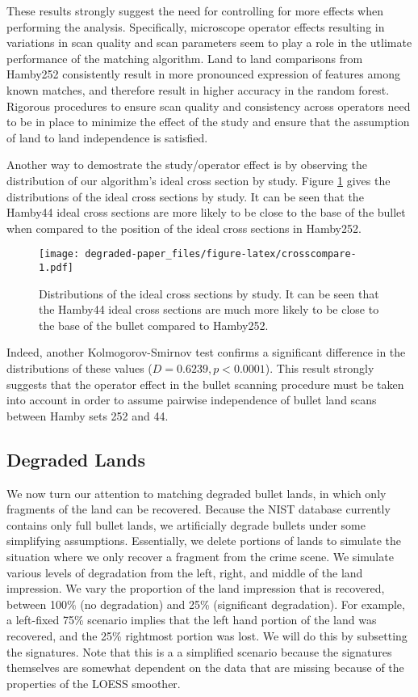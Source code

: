 \documentclass[12pt,]{article}
\theoremstyle{definition}
\theoremstyle{definition}
\theoremstyle{definition}
\theoremstyle{remark}
\begin{document}
These results strongly suggest the need for controlling for more effects
when performing the analysis. Specifically, microscope operator effects
resulting in variations in scan quality and scan parameters seem to play
a role in the utlimate performance of the matching algorithm. Land to
land comparisons from Hamby252 consistently result in more pronounced
expression of features among known matches, and therefore result in
higher accuracy in the random forest. Rigorous procedures to ensure scan
quality and consistency across operators need to be in place to minimize
the effect of the study and ensure that the assumption of land to land
independence is satisfied.

Another way to demostrate the study/operator effect is by observing the
distribution of our algorithm's ideal cross section by study. Figure
\ref{fig:crosscompare} gives the distributions of the ideal cross
sections by study. It can be seen that the Hamby44 ideal cross sections
are more likely to be close to the base of the bullet when compared to
the position of the ideal cross sections in Hamby252.

\begin{figure}[htbp]
\centering
\texttt{[image: degraded-paper\_files/figure-latex/crosscompare-1.pdf]}
\caption{\label{fig:crosscompare}Distributions of the ideal cross sections
by study. It can be seen that the Hamby44 ideal cross sections are much
more likely to be close to the base of the bullet compared to Hamby252.}
\end{figure}

Indeed, another Kolmogorov-Smirnov test confirms a significant
difference in the distributions of these values
(\(D = 0.6239, p < 0.0001\)). This result strongly suggests that the
operator effect in the bullet scanning procedure must be taken into
account in order to assume pairwise independence of bullet land scans
between Hamby sets 252 and 44.

\subsection{Degraded Lands}\label{degraded-lands}

We now turn our attention to matching degraded bullet lands, in which
only fragments of the land can be recovered. Because the NIST database
currently contains only full bullet lands, we artificially degrade
bullets under some simplifying assumptions. Essentially, we delete
portions of lands to simulate the situation where we only recover a
fragment from the crime scene. We simulate various levels of degradation
from the left, right, and middle of the land impression. We vary the
proportion of the land impression that is recovered, between 100\% (no
degradation) and 25\% (significant degradation). For example, a
left-fixed 75\% scenario implies that the left hand portion of the land
was recovered, and the 25\% rightmost portion was lost. We will do this
by subsetting the signatures. Note that this is a a simplified scenario
because the signatures themselves are somewhat dependent on the data
that are missing because of the properties of the LOESS smoother.
\end{document}

